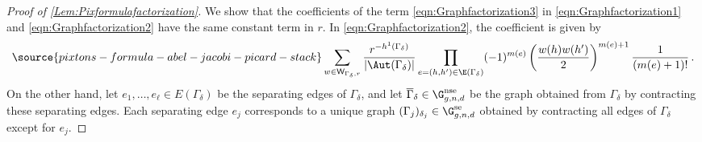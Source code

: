 \begin{proof}[Proof of \cref{Lem:Pixformulafactorization}]
We show that the coefficients of the term \eqref{eqn:Graphfactorization3} in \eqref{eqn:Graphfactorization1} and \eqref{eqn:Graphfactorization2} have the same constant term in $r$. In \eqref{eqn:Graphfactorization2}, the coefficient is given by
\begin{equation} \label{eqn:Graphfaccoeff1}
\source{pixtons-formula-abel-jacobi-picard-stack}
    \sum_{
w\in \mathsf{W}_{\Gamma_\delta,r}}
\frac{r^{-h^1(\Gamma_\delta)}}{|\Aut(\Gamma_\delta)| }
\prod_{e=(h,h')\in \E(\Gamma_\delta)}
 (-1)^{m(e)} \left(\frac{w(h)w(h')}{2}\right)^{m(e)+1} \frac{1}{(m(e)+1)!}\, .
\end{equation}
On the other hand, let $e_1, \ldots, e_\ell \in E(\Gamma_\delta)$ be the separating edges of $\Gamma_\delta$, and let $\overline{\Gamma}_{\delta} \in \G_{g,n,d}^\textup{nse}$ be the graph obtained from $\Gamma_\delta$ by contracting these separating edges. Each separating edge $e_j$ corresponds to a unique graph $(\Gamma_j)_{\delta_j} \in \G_{g,n,d}^\textup{se}$ obtained by contracting all edges of $\Gamma_\delta$ except for $e_j$.


\end{proof}
